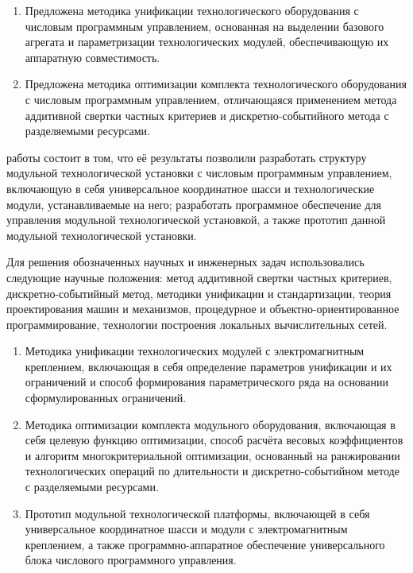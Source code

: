 {\novelty}
\begin{enumerate}[beginpenalty=10000] %
 \item Предложена методика унификации технологического оборудования с числовым программным управлением, основанная на выделении базового агрегата и параметризации технологических модулей, обеспечивающую их аппаратную совместимость.
 \item Предложена методика оптимизации комплекта технологического оборудования с числовым программным управлением, отличающаяся применением метода аддитивной свертки частных критериев и дискретно-событийного метода с разделяемыми ресурсами.
 
\end{enumerate}

{\influence} работы состоит в том, что её результаты позволили разработать структуру модульной технологической установки с числовым программным управлением, включающую в себя универсальное координатное шасси и технологические модули, устанавливаемые на него; разработать программное обеспечение для управления модульной технологической установкой, а также прототип данной модульной технологической установки.

{\methods} Для решения обозначенных научных и инженерных задач использовались следующие научные положения: метод аддитивной свертки частных критериев, дискретно-событийный метод, методики унификации и стандартизации, теория проектирования машин и механизмов, процедурное и объектно-­ориентированное программирование, технологии построения локальных вычислительных сетей.

{}
\begin{enumerate}[beginpenalty=10000] %
  \item Методика унификации технологических модулей с электромагнитным креплением, включающая в себя определение параметров унификации и их ограничений и способ формирования параметрического ряда на основании сформулированных ограничений.
  \item Методика оптимизации комплекта модульного оборудования, включающая в себя целевую функцию оптимизации, способ расчёта весовых коэффициентов и алгоритм многокритериальной оптимизации, основанный на ранжировании технологических операций по длительности и дискретно-событийном методе с разделяемыми ресурсами.
  \item Прототип модульной технологической платформы, включающей в себя универсальное координатное шасси и модули с электромагнитным креплением, а также программно-аппаратное обеспечение универсального блока числового программного управления.   
\end{enumerate}

